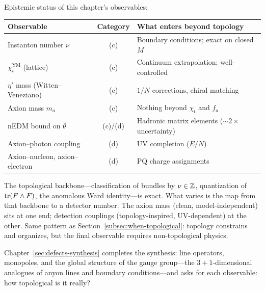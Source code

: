 \noindent Epistemic status of this chapter's observables:
\begin{center}
\renewcommand{\arraystretch}{1.3}
\begin{tabular}{l c l}
\hline\hline
\textbf{Observable} & \textbf{Category} & \textbf{What enters beyond topology} \\
\hline
Instanton number $\nu$ & (c) & Boundary conditions; exact on closed $M$ \\
$\chi_t^{\mathrm{YM}}$ (lattice) & (c) & Continuum extrapolation; well-controlled \\
$\eta'$ mass (Witten--Veneziano) & (c) & $1/N$ corrections, chiral matching \\
Axion mass $m_a$ & (c) & Nothing beyond $\chi_t$ and $f_a$ \\
nEDM bound on $\bar\theta$ & (c)/(d) & Hadronic matrix elements ($\sim\!2\times$ uncertainty) \\
Axion--photon coupling & (d) & UV completion ($E/N$) \\
Axion--nucleon, axion--electron & (d) & PQ charge assignments \\
\hline\hline
\end{tabular}
\end{center}
The topological backbone---classification of bundles by $\nu\in\mathbb{Z}$, quantization of $\operatorname{tr}(F\wedge F)$, the anomalous Ward identity---is exact.  What varies is the map from that backbone to a detector number.  The axion mass (clean, model-independent) sits at one end; detection couplings (topology-inspired, UV-dependent) at the other.  Same pattern as Section~\ref{subsec:when-topological}: topology constrains and organizes, but the final observable requires non-topological physics.

Chapter~\ref{sec:defects-synthesis} completes the synthesis: line operators, monopoles, and the global structure of the gauge group---the $3{+}1$-dimensional analogues of anyon lines and boundary conditions---and asks for each observable: how topological is it really?
